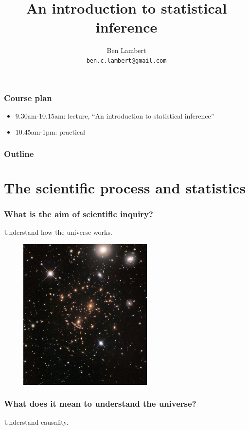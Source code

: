 \documentclass[handout]{beamer}
\title{An introduction to statistical inference}
\author[Ben Lambert]{Ben Lambert\inst{1}\\ \texttt{ben.c.lambert@gmail.com}}
\date{\displaydate{date}}
\institute[University of Oxford]{
\inst{1}University of Oxford}
\begin{document}
\begin{frame}
\titlepage
\end{frame}

\begin{frame}
	\frametitle{Course plan}
	\begin{itemize}
		\item 9.30am-10.15am: lecture, ``An introduction to statistical inference''
		\item 10.45am-1pm: practical
	\end{itemize}
	
\end{frame}

\begin{frame}
	\frametitle{Outline}
	\tableofcontents
\end{frame}

\section{The scientific process and statistics}
\frame{\tableofcontents[currentsection]}

\begin{frame}
	\frametitle{What is the aim of scientific inquiry?}
	Understand how the universe works.
	
		\begin{figure}[ht]
			\centerline{\includegraphics[width=0.6\textwidth]{../figures/universe.jpeg}}
		\end{figure}
	
\end{frame}

\begin{frame}
	\frametitle{What does it mean to understand the universe?}
	
	Understand causality.
	
\end{frame}
\end{document}
